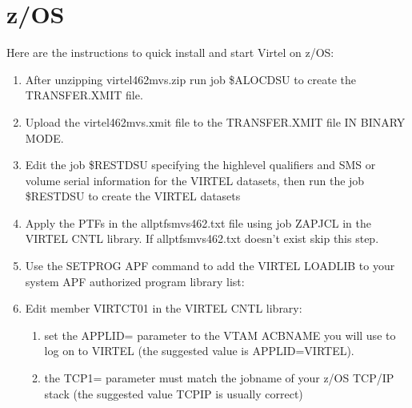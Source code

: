 \documentclass[letterpaper,10pt,english]{sphinxmanual}
\begin{document}
\section{z/OS}
\label{\detokenize{Getting_Started:z-os}}
\sphinxAtStartPar
Here are the instructions to quick install and start Virtel on z/OS:
\begin{enumerate}
%
\item {} 
\sphinxAtStartPar
After unzipping virtel462mvs.zip run job \$ALOCDSU to create the TRANSFER.XMIT file.

\item {} 
\sphinxAtStartPar
Upload the virtel462mvs.xmit file to the TRANSFER.XMIT file IN BINARY MODE.

\item {} 
\sphinxAtStartPar
Edit the job \$RESTDSU specifying the high\sphinxhyphen{}level qualifiers and SMS or volume serial information for the VIRTEL datasets, then run the job \$RESTDSU to create the VIRTEL datasets

\item {} 
\sphinxAtStartPar
Apply the PTFs in the allptfs\sphinxhyphen{}mvs462.txt file using job ZAPJCL in the VIRTEL CNTL library. If allptfs\sphinxhyphen{}mvs462.txt doesn’t exist skip this step.

\item {} 
\sphinxAtStartPar
Use the SETPROG APF command to add the VIRTEL LOADLIB to your system APF authorized program library list:

\begin{sphinxVerbatim}[commandchars=\\\{\}]
 
\end{sphinxVerbatim}

\item {} 
\sphinxAtStartPar
Edit member VIRTCT01 in the VIRTEL CNTL library:
\begin{enumerate}
%
\item {} 
\sphinxAtStartPar
set the APPLID= parameter to the VTAM ACBNAME you will use to log
on to VIRTEL (the suggested value is APPLID=VIRTEL).

\item {} 
\sphinxAtStartPar
the TCP1= parameter must match the jobname of your z/OS
TCP/IP stack (the suggested value TCPIP is usually correct)


\end{enumerate}
\end{enumerate}
\end{document}
